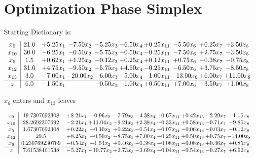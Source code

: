 \documentclass[9pt]{article}
\begin{document}
\section{Optimization Phase Simplex}
Starting Dictionary is:
\[\begin{array}{c| c c@{\hskip 2pt} c@{\hskip 2pt} c@{\hskip 2pt} c@{\hskip 2pt} c@{\hskip 2pt} c@{\hskip 2pt} c@{\hskip 2pt} c@{\hskip 2pt} }
 x_{9}   &  21.0 & +  5.25 x_{1} & -7.50 x_{2} & -5.25 x_{3} & -6.50 x_{4} & +  0.25 x_{11} & -5.50 x_{6} & +  0.25 x_{7} & +  3.50 x_{8}\\
 x_{10}   &  30.0 & -6.25 x_{1} & -0.50 x_{2} & -5.75 x_{3} & -0.50 x_{4} & -0.25 x_{11} & -7.50 x_{6} & +  2.75 x_{7} & -3.50 x_{8}\\
 x_{5}   &  1.5 & +  0.62 x_{1} & +  1.25 x_{2} & -0.12 x_{3} & -0.25 x_{4} & +  0.12 x_{11} & +  0.75 x_{6} & -0.38 x_{7} & -0.75 x_{8}\\
 x_{12}   &  31.0 & +  4.75 x_{1} & -9.50 x_{2} & -5.75 x_{3} & +  4.50 x_{4} & -0.25 x_{11} & -6.50 x_{6} & +  3.75 x_{7} & -8.50 x_{8}\\
 x_{13}   &  3.0 & -7.00 x_{1} & -20.00 x_{2} & +  6.00 x_{3} & -5.00 x_{4} & -1.00 x_{11} & -13.00 x_{6} & +  6.00 x_{7} & + 11.00 x_{8}\\
\hline
z    &  6.0 & -1.50 x_{1} &   & -0.50 x_{3} & -1.00 x_{4} & +  0.50 x_{11} & +  7.00 x_{6} & -3.50 x_{7} & +  1.00 x_{8}\\
\end{array}\]


 $ x_{6} $ enters and $ x_{13} $ leaves 

 \[\begin{array}{c| c c@{\hskip 2pt} c@{\hskip 2pt} c@{\hskip 2pt} c@{\hskip 2pt} c@{\hskip 2pt} c@{\hskip 2pt} c@{\hskip 2pt} c@{\hskip 2pt} }
 x_{9}   &  19.7307692308 & +  8.21 x_{1} & +  0.96 x_{2} & -7.79 x_{3} & -4.38 x_{4} & +  0.67 x_{11} & +  0.42 x_{13} & -2.29 x_{7} & -1.15 x_{8}\\
 x_{10}   &  28.2692307692 & -2.21 x_{1} & + 11.04 x_{2} & -9.21 x_{3} & +  2.38 x_{4} & +  0.33 x_{11} & +  0.58 x_{13} & -0.71 x_{7} & -9.85 x_{8}\\
 x_{5}   &  1.67307692308 & +  0.22 x_{1} & +  0.10 x_{2} & +  0.22 x_{3} & -0.54 x_{4} & +  0.07 x_{11} & -0.06 x_{13} & -0.03 x_{7} & -0.12 x_{8}\\
 x_{12}   &  29.5 & +  8.25 x_{1} & +  0.50 x_{2} & -8.75 x_{3} & +  7.00 x_{4} & +  0.25 x_{11} & +  0.50 x_{13} & +  0.75 x_{7} & -14.00 x_{8}\\
 x_{6}   &  0.230769230769 & -0.54 x_{1} & -1.54 x_{2} & +  0.46 x_{3} & -0.38 x_{4} & -0.08 x_{11} & -0.08 x_{13} & +  0.46 x_{7} & +  0.85 x_{8}\\
\hline
z    &  7.61538461538 & -5.27 x_{1} & -10.77 x_{2} & +  2.73 x_{3} & -3.69 x_{4} & -0.04 x_{11} & -0.54 x_{13} & -0.27 x_{7} & +  6.92 x_{8}\\
\end{array}\]
\end{document}
